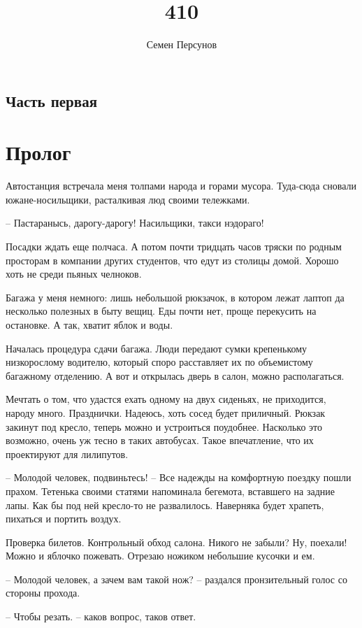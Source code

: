 \documentclass[a4paper]{book}
\title{410}
\author{Семен Персунов}
\begin{document}
 
\maketitle

\tableofcontents

\section{Часть первая}
\chapter{Пролог}
Автостанция встречала меня толпами народа и горами мусора. Туда-сюда сновали южане-носильщики, расталкивая люд своими тележками. 
 
-- Пастаранысь, дарогу-дарогу! Насильщики, такси нэдораго!

Посадки ждать еще полчаса. А потом почти тридцать часов тряски по родным просторам в компании других студентов, что едут из столицы домой. Хорошо хоть не среди пьяных челноков.

Багажа у меня немного: лишь небольшой рюкзачок, в котором лежат лаптоп да несколько полезных в быту вещиц. Еды почти нет, проще перекусить на остановке. А так, хватит яблок и  воды. 

Началась процедура сдачи багажа. Люди передают сумки крепенькому низкорослому водителю, который споро расставляет их по объемистому багажному отделению. А вот и открылась дверь в салон, можно располагаться. 

Мечтать о том, что удастся ехать одному на двух сиденьях, не приходится, народу много. Празднички. Надеюсь, хоть сосед будет приличный. Рюкзак закинут под кресло, теперь можно и устроиться поудобнее. Насколько это возможно, очень уж тесно в таких автобусах. Такое впечатление, что их проектируют для лилипутов.

-- Молодой человек, подвиньтесь! -- Все надежды на комфортную поездку пошли прахом. Тетенька своими статями напоминала бегемота, вставшего на задние лапы. Как бы под ней кресло-то не развалилось. Наверняка будет храпеть, пихаться и портить воздух. 

Проверка билетов. Контрольный обход салона. Никого не забыли? Ну, поехали! Можно и яблочко пожевать. Отрезаю ножиком небольшие кусочки и ем. 

-- Молодой человек, а зачем вам такой нож? -- раздался пронзительный голос со стороны прохода.

-- Чтобы резать. -- каков вопрос, таков ответ.
\end{document}
